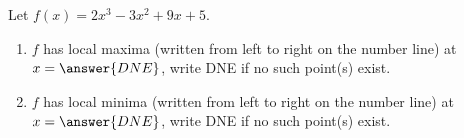 \documentclass{ximera}
\author{Gregory Hartman \and Matthew Carr}
\begin{document}
\begin{exercise}






Let $f(x)=2x^3-3x^2+9x+5$.
\begin{enumerate}
\item		$f$ has local maxima (written from left to right on the number line) at $x=\answer{DNE}$, write DNE if no such point(s) exist.
\item		$f$ has local minima (written from left to right on the number line) at $x=\answer{DNE}$, write DNE if no such point(s) exist.
\end{enumerate}

\end{exercise}
\end{document}
